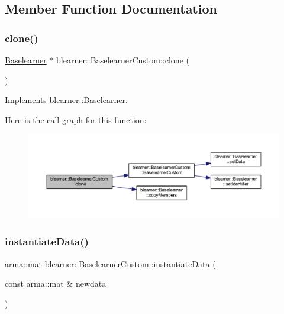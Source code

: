 \subsection{Member Function Documentation}
\mbox{\label{classblearner_1_1_baselearner_custom_a1442790658c7ad08832a94fbc60ff94a}} 
\subsubsection{\texorpdfstring{clone()}{clone()}}
{\footnotesize\ttfamily \hyperlink{classblearner_1_1_baselearner}{Baselearner} $\ast$ blearner\+::\+Baselearner\+Custom\+::clone (\begin{DoxyParamCaption}{ }\end{DoxyParamCaption})\hspace{0.3cm}{\ttfamily [virtual]}}



Implements \hyperlink{classblearner_1_1_baselearner_a8e12c6739f085917a7d2da6570c51a21}{blearner\+::\+Baselearner}.

Here is the call graph for this function\+:\nopagebreak
\begin{figure}[H]
\begin{center}
\leavevmode
\includegraphics[width=350pt]{classblearner_1_1_baselearner_custom_a1442790658c7ad08832a94fbc60ff94a_cgraph}
\end{center}
\end{figure}
\mbox{\label{classblearner_1_1_baselearner_custom_a83c25e681bb606ae4a36c249a36229b9}} 
\subsubsection{\texorpdfstring{instantiate\+Data()}{instantiateData()}}
{\footnotesize\ttfamily arma\+::mat blearner\+::\+Baselearner\+Custom\+::instantiate\+Data (\begin{DoxyParamCaption}\item[{const arma\+::mat \&}]{newdata }\end{DoxyParamCaption})\hspace{0.3cm}{\ttfamily [virtual]}}



